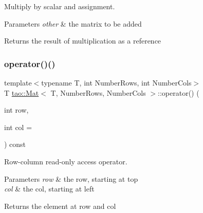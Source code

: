 Multiply by scalar and assignment. 


\begin{DoxyParams}{Parameters}
{\em other} & the matrix to be added \\
\hline
\end{DoxyParams}
\begin{DoxyReturn}{Returns}
the result of multiplication as a reference 
\end{DoxyReturn}
\mbox{\label{classtao_1_1_mat_a57eab1bb6cced77617322c10e5af1d21}} 
\subsubsection{\texorpdfstring{operator()()}{operator()()}\hspace{0.1cm}{\footnotesize\ttfamily [1/2]}}
{\footnotesize\ttfamily template$<$typename T, int Number\+Rows, int Number\+Cols$>$ \\
T \mbox{\hyperlink{classtao_1_1_mat}{tao\+::\+Mat}}$<$ T, Number\+Rows, Number\+Cols $>$\+::operator() (\begin{DoxyParamCaption}\item[{int}]{row,  }\item[{int}]{col = {} }\end{DoxyParamCaption}) const\hspace{0.3cm}{\ttfamily [inline]}}



Row-\/column read-\/only access operator. 


\begin{DoxyParams}{Parameters}
{\em row} & the row, starting at top \\
\hline
{\em col} & the col, starting at left \\
\hline
\end{DoxyParams}
\begin{DoxyReturn}{Returns}
the element at row and col 
\end{DoxyReturn}
\mbox{\label{classtao_1_1_mat_a15af7f1814cfb14b628e283e0fec5310}} 
